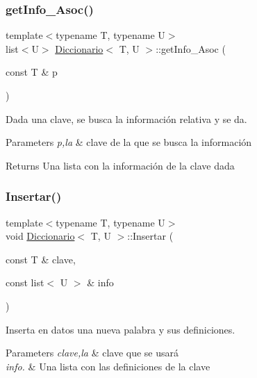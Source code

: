 \subsubsection{\texorpdfstring{get\+Info\+\_\+\+Asoc()}{getInfo\_Asoc()}}
{\footnotesize\ttfamily template$<$typename T, typename U$>$ \\
list$<$U$>$ \hyperlink{classDiccionario}{Diccionario}$<$ T, U $>$\+::get\+Info\+\_\+\+Asoc (\begin{DoxyParamCaption}\item[{const T \&}]{p }\end{DoxyParamCaption})}



Dada una clave, se busca la información relativa y se da. 


\begin{DoxyParams}{Parameters}
{\em p,la} & clave de la que se busca la información \\
\hline
\end{DoxyParams}
\begin{DoxyReturn}{Returns}
Una lista con la información de la clave dada 
\end{DoxyReturn}
\mbox{\label{classDiccionario_af520b73907852cc8002260ddf9fb822c}} 
\subsubsection{\texorpdfstring{Insertar()}{Insertar()}}
{\footnotesize\ttfamily template$<$typename T, typename U$>$ \\
void \hyperlink{classDiccionario}{Diccionario}$<$ T, U $>$\+::Insertar (\begin{DoxyParamCaption}\item[{const T \&}]{clave,  }\item[{const list$<$ U $>$ \&}]{info }\end{DoxyParamCaption})}



Inserta en datos una nueva palabra y sus definiciones. 


\begin{DoxyParams}{Parameters}
{\em clave,la} & clave que se usará \\
\hline
{\em info.} & Una lista con las definiciones de la clave \\
\hline
\end{DoxyParams}
\mbox{\label{classDiccionario_ae67ff814fff769cfd1b08fc65e161ce3}} 
